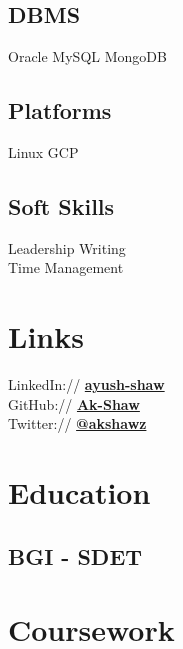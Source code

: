 \documentclass[]{deedy-resume-openfont}
\begin{document}
\begin{minipage}[t]{0.33\textwidth}
\subsection{DBMS}
Oracle \textbullet{} MySQL \textbullet{} MongoDB
\sectionsep

\subsection{Platforms}
Linux \textbullet{} GCP 
\sectionsep

\subsection{Soft Skills}
Leadership \textbullet{} Writing \\ 
\textbullet{} Time Management
\sectionsep


\section{Links} 
LinkedIn://  \href{https://www.linkedin.com/in/ayush-shaw}{\bf ayush-shaw} \\
GitHub://  \href{https://github.com/Ak-Shaw}{\bf Ak-Shaw} \\
Twitter://  \href{https://twitter.com/akshawz}{\bf @akshawz} \\
\sectionsep


\section{Education} 

\subsection{BGI - SDET}
\sectionsep


\section{Coursework}


\end{minipage}
\end{document}

